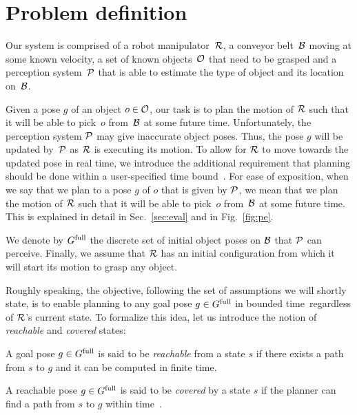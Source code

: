 \documentclass[conference]{IEEEtran}
\begin{document}
\section{Problem definition}
Our system is comprised of 
a robot manipulator~$\mathcal{R}$,
a conveyor belt~$\mathcal{B}$ moving at some known velocity,
a set of known objects~$\mathcal{O}$ that need to be grasped and 
a perception system~$\mathcal{P}$ that is able to estimate the type of object and its location on~$\mathcal{B}$.

Given a pose $g$ of an object $o \in \mathcal{O}$, our task is to plan the motion of $\mathcal{R}$ such that it will be able to pick~$o$ from~$\mathcal{B}$ at some future time.
%
Unfortunately, the perception system $\mathcal{P}$ may give inaccurate object poses.
Thus, the pose $g$ will be updated by~$\mathcal{P}$ as $\mathcal{R}$ is executing its motion. 
To allow for $\mathcal{R}$ to move towards the updated pose in real time, we introduce the additional requirement that planning should be done within a user-specified time bound~\Tbound.
%
For ease of exposition, when we say that we plan to a pose $g$ of $o$ that is given by $\mathcal{P}$, 
we mean that we plan the motion of $\mathcal{R}$ such that it will be able to pick~$o$ from~$\mathcal{B}$ at some future time. 
This is explained in detail in Sec.~\ref{sec:eval} and in Fig.~\ref{fig:pe}.

%
We denote by $G^{\textrm{full}}$ the discrete set of initial object poses on $\mathcal{B}$ that $\mathcal{P}$ can perceive.
%
Finally, we assume that $\mathcal{R}$ has an initial configuration \Shome from which it will start its motion to grasp any object.


Roughly speaking, the objective, following the set of assumptions we will shortly state, is to enable planning to any goal pose $ g \in G^{\textrm{full}}$ in bounded time~\Tbound regardless of $\mathcal{R}$'s current state.
To formalize this idea, let us introduce the notion of \emph{reachable} and \emph{covered} states:

\vspace{2mm}
\begin{definition}
    A goal pose $g \in G^{\textrm{full}}$ is said to be \emph{reachable} from a state $s$ if there exists a path from $s$ to $g$ and it can be computed in finite time.
\end{definition}

\vspace{2mm}
\begin{definition}
    A reachable pose $g \in G^{\textrm{full}}$ is said to be \emph{covered} by a state $s$ if 
    the planner can find a path from $s$ to $g$ within time~\Tbound.
\end{definition}
\end{document}
